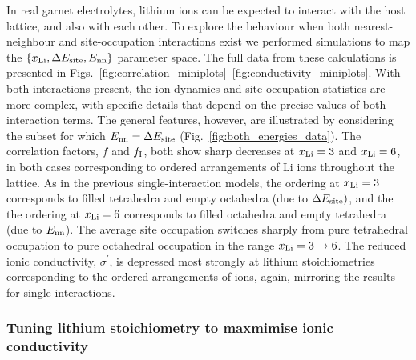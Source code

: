 \documentclass[aps,prb,twocolumn,superscriptaddress,reprint]{revtex4-1}
\newcommand{\xLi}{x_\m{Li}}
\begin{document}
In real garnet electrolytes, lithium ions can be expected to interact with the host lattice, and also with each other. To explore the behaviour when both nearest-neighbour and site-occupation interactions exist we performed simulations to map the $\left\{\xLi, \Delta E_\m{site}, E_\m{nn}\right\}$ parameter space. 
The full data from these calculations is presented in Figs.~\ref{fig:correlation_miniplots}--\ref{fig:conductivity_miniplots}. With both interactions present, the ion dynamics and site occupation statistics are  more complex, with specific details that depend on the precise values of both interaction terms. The general features, however, are illustrated by considering the subset for which $E_{\mathrm{nn}}=\Delta E_{\mathrm{site}}$ (Fig.~\ref{fig:both_energies_data}). The correlation factors, $f$ and $f_{\mathrm{I}}$, both show sharp decreases at $\xLi=3$ and $\xLi=6$, in both cases corresponding to ordered arrangements of Li ions throughout the lattice. As in the previous single-interaction models, the ordering at $\xLi=3$ corresponds to filled tetrahedra and empty octahedra (due to $\Delta E_{\mathrm{site}})$, and the the ordering at $\xLi=6$ corresponds to filled octahedra and empty tetrahedra (due to $E_{\mathrm{nn}}$). The average site occupation switches sharply from pure tetrahedral occupation to pure octahedral occupation in the range $\xLi=3\to6$. The reduced ionic conductivity, $\sigma^\prime$, is depressed most strongly at lithium stoichiometries corresponding to the ordered arrangements of ions, again, mirroring the results for single interactions. 

\subsubsection{Tuning lithium stoichiometry to maxmimise ionic conductivity}
\end{document}
